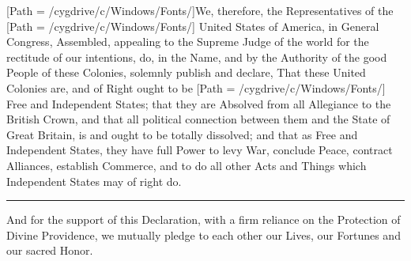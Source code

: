 \documentclass{article}
\begin{document}
[Path = /cygdrive/c/Windows/Fonts/]We,
therefore, \rmfamily the Representatives of the
[Path = /cygdrive/c/Windows/Fonts/] United
States of America, \rmfamily in General Congress, Assembled, appealing
to the Supreme Judge of the world for the rectitude of our intentions,
do, in the Name, and by the Authority of the good People of these
Colonies, solemnly publish and declare, That these United Colonies
are, and of Right ought to be [Path =
  /cygdrive/c/Windows/Fonts/] Free and Independent States; \rmfamily
that they are Absolved from all Allegiance to the British Crown, and
that all political connection between them and the State of Great
Britain, is and ought to be totally dissolved; and that as Free and
Independent States, they have full Power to levy War, conclude Peace,
contract Alliances, establish Commerce, and to do all other Acts and
Things which Independent States may of right
do.\rule[.5ex]{2em}{.2pt}And for the support of this Declaration, with
a firm reliance on the Protection of Divine Providence, we mutually
pledge to each other our Lives, our Fortunes and our sacred Honor.
\end{document}
